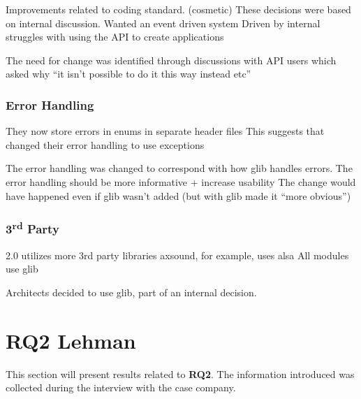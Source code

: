 \documentclass[conference]{IEEEtran}
\begin{document}
Improvements related to coding standard. (cosmetic)
These decisions were based on internal discussion.
Wanted an event driven system
Driven by internal struggles with using the API to create applications

The need for change was identified through discussions with API users which asked why “it isn’t possible to do it this way instead etc”





\subsubsection{Error Handling}

They now store errors in enums in separate header files
This suggests that changed their error handling to use exceptions




The error handling was changed to correspond with how glib handles errors. 
The error handling should be more informative + increase usability
The change would have happened even if glib wasn’t added (but with glib made it “more obvious”)





\subsubsection{3\textsuperscript{rd} Party}

2.0 utilizes more 3rd party libraries
axsound, for example, uses alsa
All modules use glib





Architects decided to use glib, part of an internal decision. 


\newpage
\section{RQ2 Lehman}
This section will present results related to \textbf{RQ2}. The information introduced was collected during the interview with the case company. 
\end{document}
